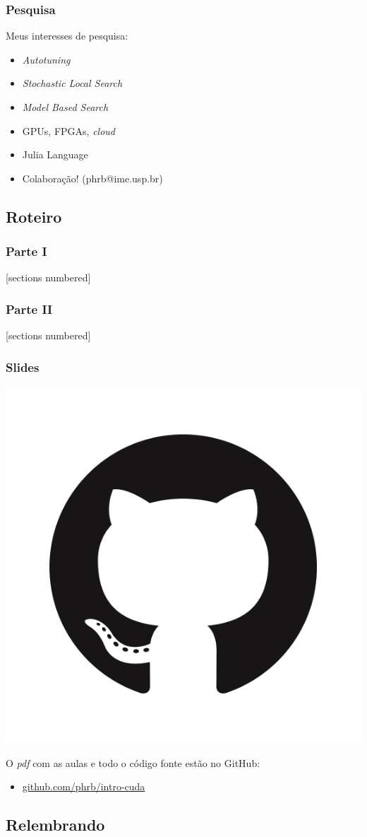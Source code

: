 \documentclass[10pt, compress]{beamer}
\begin{document}
\begin{frame}
    \frametitle{Pesquisa}
    Meus interesses de \alert{pesquisa}:
    \begin{itemize}
        \item \textit{Autotuning}
        \item \textit{Stochastic Local Search}
        \item \textit{Model Based Search}
        \item GPUs, FPGAs, \textit{cloud}
        \item Julia Language
        \item Colaboração! (\alert{phrb@ime.usp.br})
    \end{itemize}
\end{frame}

\subsection{Roteiro}

\begin{frame}
    \frametitle{Parte I}
    [sections numbered]
    \tableofcontents[hideallsubsections, part=1]
\end{frame}

\begin{frame}
    \frametitle{Parte II}
    [sections numbered]
    \tableofcontents[hideallsubsections, part=2]
\end{frame}

\begin{frame}
    \frametitle{Slides}
    \begin{center}
        \includegraphics[width=.18\textwidth]{github}
    \end{center}
    O \emph{pdf} com as aulas e todo o código fonte estão no \alert{GitHub}:

    \begin{itemize}
        \item \url{github.com/phrb/intro-cuda}
    \end{itemize}
\end{frame}

\subsection{Relembrando}
\end{document}
